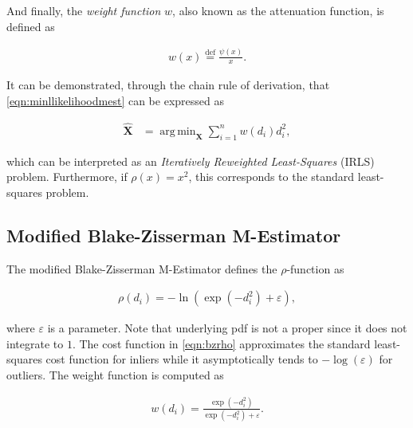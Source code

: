 \documentclass[12pt]{article}
\DeclareMathOperator*{\argmin}{arg\,min}
\begin{document}
  \noindent And finally, the \emph{weight function} $w$, also known as the
  attenuation function, is defined as

  \begin{equation}\label{eqn:weight}
    \begin{aligned}
      w(x) \stackrel{\mathrm{def}}{=} \frac{\psi(x)}{x}.
    \end{aligned}
  \end{equation}

  It can be demonstrated, through the chain rule of derivation, that
  \eqref{eqn:minllikelihoodmest} can be expressed as

  \begin{equation}\label{eqn:minllikelihoodmest2}
    \begin{aligned}
      \mathbf{\hat{X}} &=
        \argmin_{\mathbf{X}}\sum_{i=1}^n w(d_i)d_i^2,
    \end{aligned}
  \end{equation}

  \noindent which can be interpreted as an
  \emph{Iteratively Reweighted Least-Squares} (IRLS) problem. Furthermore, if
  $\rho(x)=x^2$, this corresponds to the standard least-squares problem.

  \subsection{Modified Blake-Zisserman M-Estimator}

     The modified Blake-Zisserman M-Estimator defines the $\rho$-function as

      \begin{equation}\label{eqn:bzrho}
        \begin{aligned}
          \rho(d_i) = -\ln(\exp(-d_i^2) + \varepsilon),
        \end{aligned}
      \end{equation}

      \noindent where $\varepsilon$ is a parameter. Note that underlying pdf
      is not a proper since it does not integrate to $1$. The cost function in
      \eqref{eqn:bzrho} approximates the standard
      least-squares cost function for inliers while it asymptotically tends
      to $-\log(\varepsilon)$ for outliers. The weight function is computed as

      \begin{equation}\label{eqn:bzw}
        \begin{aligned}
          w(d_i) = \frac{\exp(-d_i^2)}{\exp(-d_i^2) + \varepsilon}.
        \end{aligned}
      \end{equation}
\end{document}
